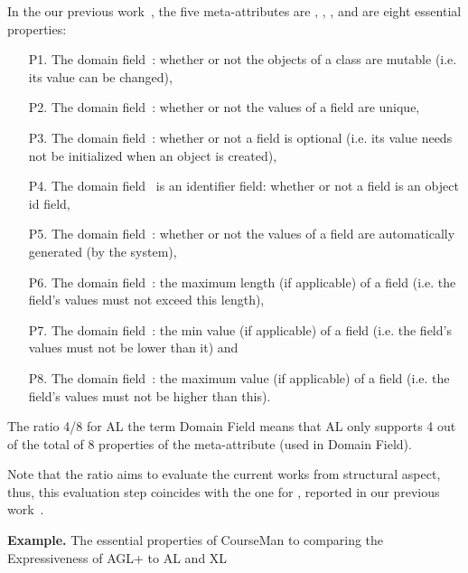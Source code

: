 	In the our previous work~\cite{le_domain_2018}, the five meta-attributes are , , ,  and  are eight  essential properties: 
	\begin{enumerate}
		\item[P1.] The domain field~: whether or not the objects of a class are mutable  (i.e. its value can be changed),
		\item[P2.] The domain field~: whether or not the values of a field are unique,
		\item[P3.] The domain field~: whether or not a field is optional (i.e. its value needs not be initialized when an object is created),
		\item[P4.] The domain field~ is an identifier field: whether or not a field is an object id field,
		\item[P5.] The domain field~: whether or not the values of a field are automatically generated (by the system),
		\item[P6.] The domain field~: the maximum length (if applicable) of a field (i.e. the field’s values must not exceed this length),
		\item[P7.] The domain field~:  the min value (if applicable) of a field (i.e. the field’s values must not be lower than it) and
		\item[P8.] The domain field~:  the maximum value (if applicable) of a field (i.e. the field’s values must not be higher than this).
				
	\end{enumerate}
	The ratio 4/8 for AL \wrt the term Domain Field means that AL only supports 4 out of the total of 8 properties of the meta-attribute  (used in Domain Field). 
	
	Note that the ratio aims to evaluate the current works from structural aspect, thus, this evaluation step coincides with the one for \dcsl, reported in our previous work~\cite{le_domain_2018}. %
	
	\noindent\textbf{Example.} The essential properties of CourseMan to comparing the Expressiveness of AGL+ to AL and XL
	
